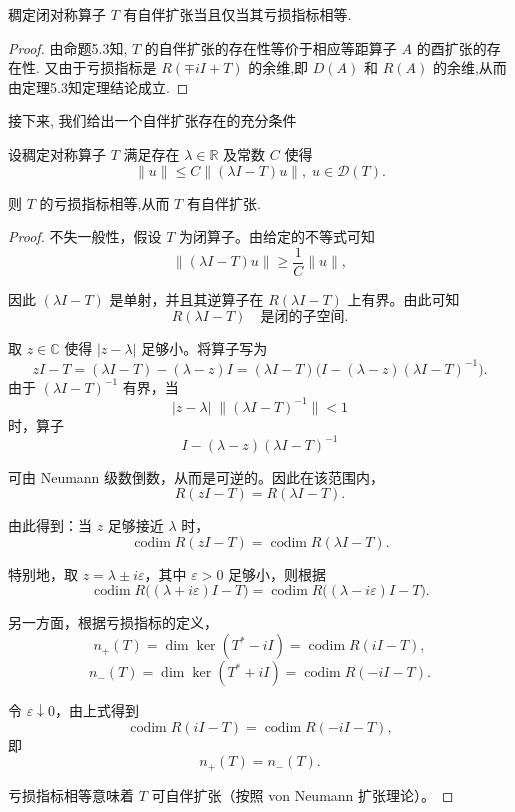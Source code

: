 \documentclass[lang=cn,newtx,10pt,scheme=chinese,thmcnt=chapter]{elegantbook}
\begin{document}
\begin{proposition}
        稠定闭对称算子 \(T\) 有自伴扩张当且仅当其亏损指标相等.
\end{proposition}

\begin{proof}
    由命题5.3知, \(T\) 的自伴扩张的存在性等价于相应等距算子 \(A\) 的酉扩张的存在性. 又由于亏损指标是 \(R\left( {\mp {iI} + T}\right)\) 的余维,即 \(D\left( A\right)\) 和 \(R\left( A\right)\) 的余维,从而由定理5.3知定理结论成立.
\end{proof}

接下来, 我们给出一个自伴扩张存在的充分条件
\begin{theorem}
    设稠定对称算子 \(T\) 满足存在 \(\lambda  \in  \mathbb{R}\) 及常数 \(C\) 使得
\begin{equation*}
\parallel u\parallel  \leq  C\parallel \left( {{\lambda I} - T}\right) u\parallel ,\;u \in  \mathcal{D}(T) .
\end{equation*}

则 \(T\) 的亏损指标相等,从而 \(T\) 有自伴扩张.
\end{theorem}



\begin{proof}
不失一般性，假设 $T$ 为闭算子。由给定的不等式可知
\[
\|(\lambda I - T)u\|\ge \frac{1}{C}\|u\|,
\]

因此 $(\lambda I - T)$ 是单射，并且其逆算子在 $R(\lambda I - T)$ 上有界。由此可知
\[
R(\lambda I - T)
\quad \text{是闭的子空间}.
\]

取 $z\in\mathbb{C}$ 使得 $|z-\lambda|$ 足够小。将算子写为
\[
zI - T
= (\lambda I - T) - (\lambda - z)I
= (\lambda I - T)\bigl(I - (\lambda - z)(\lambda I - T)^{-1}\bigr).
\]
由于 $(\lambda I - T)^{-1}$ 有界，当
\[
|z-\lambda|\;\|(\lambda I - T)^{-1}\|<1
\]
时，算子
\[
I - (\lambda - z)(\lambda I - T)^{-1}
\]

可由 Neumann 级数倒数，从而是可逆的。因此在该范围内，
\[
R(zI - T)
= R(\lambda I - T).
\]

由此得到：当 $z$ 足够接近 $\lambda$ 时，
\[
\operatorname{codim} R(zI - T)
= \operatorname{codim} R(\lambda I - T).
\]

特别地，取 $z = \lambda \pm i\varepsilon$，其中 $\varepsilon>0$ 足够小，则根据 
\[
\operatorname{codim} R\bigl((\lambda+i\varepsilon)I - T \bigr)
=
\operatorname{codim} R\bigl((\lambda-i\varepsilon)I - T \bigr).
\]

另一方面，根据亏损指标的定义，
\[
n_{+}(T)
= \dim \ker (T^{*}-iI)
= \operatorname{codim} R(iI - T),
\]
\[
n_{-}(T)
= \dim \ker (T^{*}+iI)
= \operatorname{codim} R(-iI - T).
\]

令 $\varepsilon\downarrow 0$，由上式得到
\[
\operatorname{codim}R(iI - T)
=
\operatorname{codim}R(-iI - T),
\]
即
\[
n_{+}(T)=n_{-}(T).
\]

亏损指标相等意味着 $T$ 可自伴扩张（按照 von Neumann 扩张理论）。
\end{proof}
\end{document}
